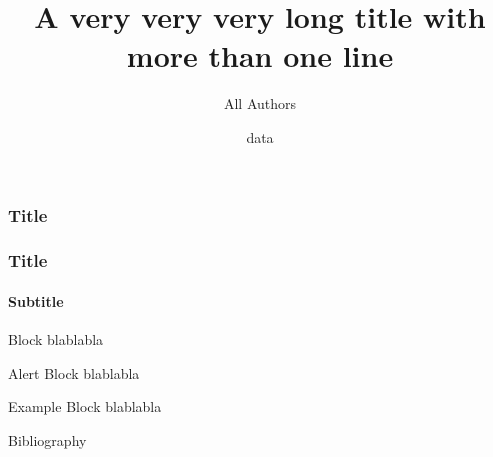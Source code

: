 \documentclass[aspectratio=169]{beamer}
\title[]{A very very very long title with more than one line}
\author[]{All Authors}
\institute{Data and Computational Biology Lab}
\date{data}
\begin{document}
\maketitle

\begin{frame}
\frametitle{Title}
    \blindtext
\end{frame}

\begin{frame}
\frametitle{Title}
\framesubtitle{Subtitle}
    
    \begin{block}{Block}
    blablabla
    \end{block}
    
    \begin{alertblock}{Alert Block}
    blablabla
    \end{alertblock}
    
    \begin{exampleblock}{Example Block}
    blablabla
    \end{exampleblock}
\end{frame}

\begin{frame}{Bibliography}

\nocite{knuthwebsite}

\printbibliography

\end{frame}
\end{document}
